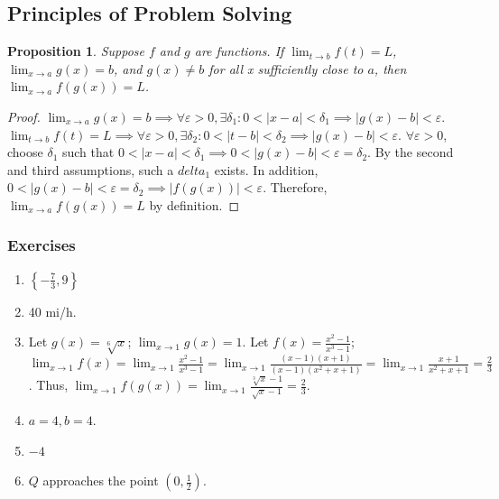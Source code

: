 \documentclass{article}
\newtheorem*{proposition*}{Proposition}
\begin{document}
\subsection*{Principles of Problem Solving}
\begin{proposition*}
  Suppose $f$ and $g$ are functions. If $\lim_{t \to b}f(t)=L$, $\lim_{x \to a}g(x)=b$, and $g(x)
    \neq b$ for all x sufficiently close to $a$, then $\lim_{x \to a}f\left(g(x)\right)=L$.
\end{proposition*}
\begin{proof}
  $\lim_{x \to a}g(x)=b\implies\forall\varepsilon>0, \exists\delta_1:0<|x-a|<\delta_1\implies
    |g(x)-b|<\varepsilon$. $\lim_{t \to b}f(t)=L\implies\forall\varepsilon>0, \exists\delta_2:0<|t-
    b|<\delta_2\implies|g(x)-b|<\varepsilon$. $\forall\varepsilon>0$, choose $\delta_1$ such that
  $0<|x-a|<\delta_1\implies0<|g(x)-b|<\varepsilon=\delta_2$. By the second and third assumptions,
  such a $delta_1$ exists. In addition, $0<|g(x)-b|<\varepsilon=\delta_2\implies\left|f\left(
    g(x)\right)\right|<\varepsilon$. Therefore, $\lim_{x \to a}f\left(g(x)\right)=L$ by definition.
\end{proof}
\subsubsection*{Exercises}
\begin{enumerate}
  \item $\left\{-\frac{7}{3}, 9\right\}$
        \setcounter{enumi}{8}
  \item 40 mi/h.
        \setcounter{enumi}{14}
  \item Let $g(x) = \sqrt[6]{x}$; $\lim_{x\to1}g(x)=1$. Let $f(x)=\frac{x^2-1}{x^3-1}$;
        $\lim_{x\to1}f(x)=\lim_{x\to1}\frac{x^2-1}{x^3-1}=\lim_{x\to1}\frac{(x-1)(x+1)}
          {(x-1)(x^2+x+1)}=\lim_{x\to1}\frac{x+1}{x^2+x+1}=\frac{2}{3}$. Thus, $\lim_{x\to1}
          f(g(x))=\lim_{x\to1}\frac{\sqrt[3]{x}-1}{\sqrt{x}-1}=\frac{2}{3}$.
  \item $a=4, b=4$.
  \item $-4$
  \item $Q$ approaches the point $(0, \frac{1}{2})$.
\end{enumerate}
\end{document}
